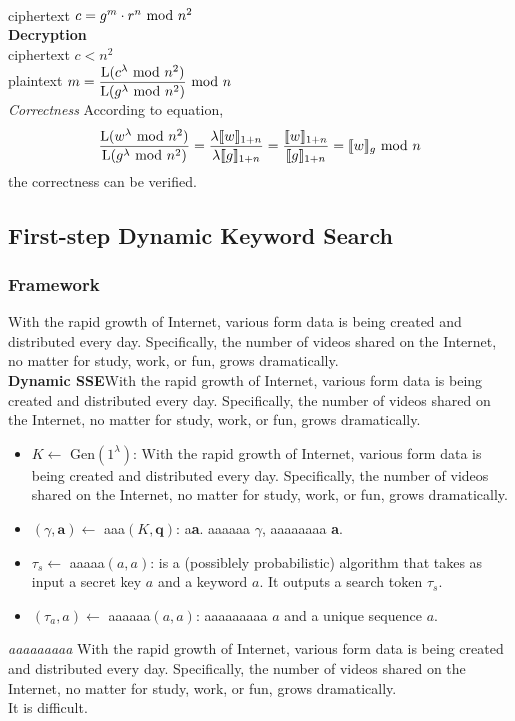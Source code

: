 \documentclass[a4paper,12pt,UTF8]{ctexart}
\begin{document}
\begin{spacing}{1.1}
\\\indent\indent\indent\indent\indent\indent\indent ciphertext $c=g^m\cdot r^n\ {\rm mod}\ n^2$
\\\indent\indent\indent\indent\indent\textbf{Decryption}
\\\indent\indent\indent\indent\indent\indent\indent ciphertext $c<n^2$
\\\indent\indent\indent\indent\indent\indent\indent plaintext $m=\dfrac{\mathrm{L}(c^\lambda\ {\rm mod}\ n^2)}{\mathrm{L}(g^\lambda\ {\rm mod}\ n^2)}\ {\rm mod}\ n$
\\\indent\textit{Correctness} According to equation,
\begin{equation}
\dfrac{\mathrm{L}(w^\lambda\ {\rm mod}\ n^2)}{\mathrm{L}(g^\lambda\ {\rm mod}\ n^2)}=\dfrac{\lambda\llbracket w \rrbracket_{1+n}}{\lambda\llbracket g \rrbracket_{1+n}}=\dfrac{\llbracket w \rrbracket_{1+n}}{\llbracket g \rrbracket_{1+n}}=\llbracket w \rrbracket_g\ {\rm mod}\ n
\end{equation}
the correctness can be verified.

\subsection{First-step Dynamic Keyword Search}
\subsubsection{Framework}
\indent With the rapid growth of Internet, various form data is being created and distributed every day. Specifically, the number of videos shared on the Internet, no matter for study, work, or fun, grows dramatically. 
\\\indent\textbf{Dynamic SSE}With the rapid growth of Internet, various form data is being created and distributed every day. Specifically, the number of videos shared on the Internet, no matter for study, work, or fun, grows dramatically. 
\begin{itemize}
	\setlength{\itemsep}{0mm} %
	\setlength{\parskip}{0mm} %
	\setlength{\parsep}{0pt} %
	\item $K\leftarrow$ \textsf{Gen}$(1^\lambda)$:  With the rapid growth of Internet, various form data is being created and distributed every day. Specifically, the number of videos shared on the Internet, no matter for study, work, or fun, grows dramatically. 
	\item $(\gamma,\textbf{a})\leftarrow$ \textsf{aaa}$(K,\textbf{q} )$:  a\textbf{a}. aaaaaa $\gamma$, aaaaaaaa \textbf{a}.
	\item $\tau_s\leftarrow$ \textsf{aaaaa}$(a,a)$: is a (possiblely probabilistic) algorithm that takes as input a secret key $a$ and a keyword $a$. It outputs a search token $\tau_s$.
	\item $(\tau_a,a)\leftarrow$ \textsf{aaaaaa}$(a,a)$: aaaaaaaaa $a$ and a unique sequence $a$. 
\end{itemize}
\indent\indent\emph{aaaaaaaaa} With the rapid growth of Internet, various form data is being created and distributed every day. Specifically, the number of videos shared on the Internet, no matter for study, work, or fun, grows dramatically. 
\\\indent It is difficult.

\end{spacing}
\end{document}
